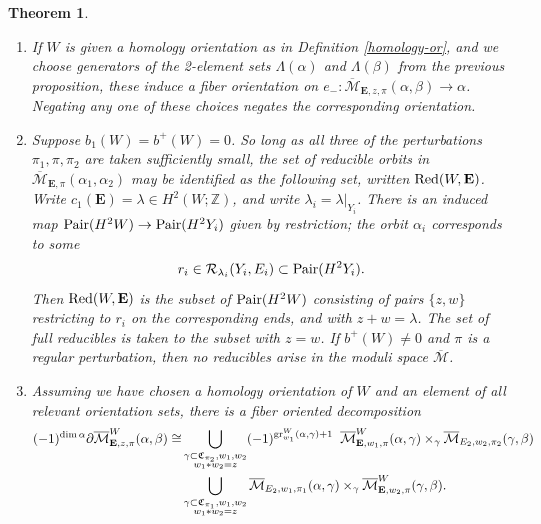 \documentclass{memo-l}
\newtheorem{theorem}{Theorem}[chapter]
\theoremstyle{definition}
\theoremstyle{remark}
\numberwithin{section}{chapter}
\numberwithin{equation}{chapter}
\begin{document}
\begin{theorem}
\begin{enumerate}
\item If $W$ is given a homology orientation as in Definition \ref{homology-or}, and we choose generators of the 2-element sets $\Lambda(\alpha)$ and $\Lambda(\beta)$ from the previous proposition, these induce a fiber orientation on $e_-: \overline{\mathcal M}_{\mathbf{E},z,\pi}(\alpha, \beta)\to \alpha$. Negating any one of these choices negates the corresponding orientation.\\
\item Suppose $b_1(W) = b^+(W) = 0$. So long as all three of the perturbations $\pi_1, \pi, \pi_2$ are taken sufficiently small, the set of reducible orbits in $\overline{\mathcal M}_{\mathbf{E},\pi}(\alpha_1, \alpha_2)$ may be identified as the following set, written $\textup{Red}(W,\mathbf{E})$. Write $c_1(\mathbf{E}) = \lambda \in H^2(W;\mathbb Z)$, and write $\lambda_i = \lambda\big|_{Y_i}$. There is an induced map $\textup{Pair}(H^2 W) \to \textup{Pair}(H^2 Y_i)$ given by restriction; the orbit $\alpha_i$ corresponds to some $$r_i \in \mathcal R_{\lambda_i}(Y_i, E_i) \subset \textup{Pair}(H^2 Y_i).$$ Then $\textup{Red}(W, \mathbf{E})$ is the subset of $\textup{Pair}(H^2 W)$ consisting of pairs $\{z, w\}$ restricting to $r_i$ on the corresponding ends, and with $z+w = \lambda$. The set of full reducibles is taken to the subset with $z = w$. If $b^+(W) \neq 0$ and $\pi$ is a regular perturbation, then no reducibles arise in the moduli space $\overline{\mathcal M}$.\\
\item Assuming we have chosen a homology orientation of $W$ and an element of all relevant orientation sets, there is a fiber oriented decomposition \begin{align*}(-1)^{\dim \alpha}\partial \overline{\mathcal M}^W_{\mathbf{E},z,\pi}(\alpha, \beta) \cong &\bigcup_{\substack{\gamma \subset \mathfrak C_{\pi_2}, w_1, w_2 \\ w_1 \ast w_2 = z}} (-1)^{\textup{gr}^W_{w_1}(\alpha, \gamma)+1}\;\; \overline{\mathcal M}^W_{\mathbf{E},w_1,\pi}(\alpha, \gamma) \times_\gamma \overline{\mathcal M}_{E_2,w_2,\pi_2}(\gamma, \beta)\\ &\bigcup_{\substack{\gamma \subset \mathfrak C_{\pi_1}, w_1, w_2 \\ w_1 \ast w_2 = z}} \overline{\mathcal M}_{E_2,w_1,\pi_1}(\alpha, \gamma) \times_\gamma \overline{\mathcal M}^W_{\mathbf{E},w_2,\pi}(\gamma, \beta).\end{align*}
\end{enumerate}
\end{theorem}
\end{document}
